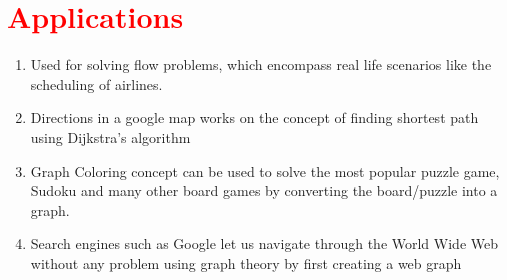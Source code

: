 \documentclass[11pt,a4paper]{article}
\begin{document}





\section*{\textcolor{red}{Applications} }
\begin{enumerate}
    \item  Used for solving flow problems, which encompass real life scenarios like the scheduling of airlines.\\
    \item Directions in a google map works on the concept of finding shortest path using Dijkstra's algorithm\\
    \item Graph Coloring concept can be used to solve the most popular puzzle game, Sudoku and many other board games by converting the board/puzzle into a graph.\\
    \item Search engines such as Google let us navigate through the World Wide Web without any problem using graph theory by first creating a web graph
    \\
\end{enumerate}
\end{document}
